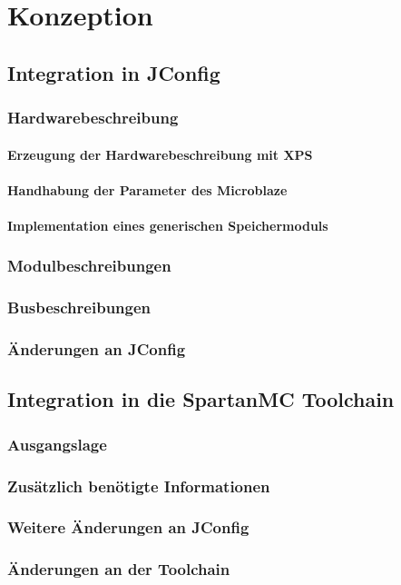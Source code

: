 \chapter{Konzeption}
\section{Integration in JConfig}
\subsection{Hardwarebeschreibung}
\subsubsection{Erzeugung der Hardwarebeschreibung mit XPS}

\subsubsection{Handhabung der Parameter des Microblaze}

\subsubsection{Implementation eines generischen Speichermoduls}

\subsection{Modulbeschreibungen}

\subsection{Busbeschreibungen}

\subsection{Änderungen an JConfig}

\section{Integration in die SpartanMC Toolchain}
\subsection{Ausgangslage}

\subsection{Zusätzlich benötigte Informationen}

\subsection{Weitere Änderungen an JConfig}

\subsection{Änderungen an der Toolchain}